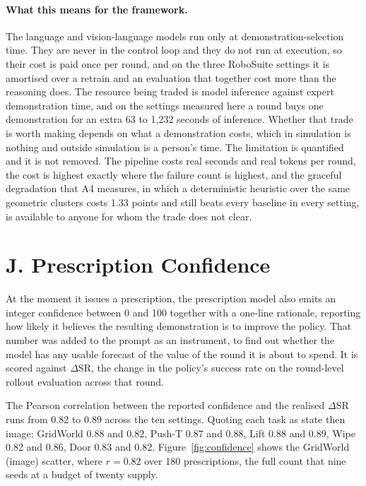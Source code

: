 \documentclass[letterpaper]{article}
\begin{document}
\paragraph{What this means for the framework.} The language and vision-language models
run only at demonstration-selection time. They are never in the control loop and they do
not run at execution, so their cost is paid once per round, and on the three RoboSuite
settings it is amortised over a retrain and an evaluation that together cost more than
the reasoning does. The resource being traded is model inference against expert
demonstration time, and on the settings measured here a round buys one demonstration for
an extra 63 to 1,232 seconds of inference. Whether that trade is worth making depends on
what a demonstration costs, which in simulation is nothing and outside simulation is a
person's time. The limitation is quantified and it is not removed. The pipeline costs
real seconds and real tokens per round, the cost is highest exactly where the failure
count is highest, and the graceful degradation that A4 measures, in which a
deterministic heuristic over the same geometric clusters costs 1.33 points and still
beats every baseline in every setting, is available to anyone for whom the trade does
not clear.

\section{J. Prescription Confidence}

At the moment it issues a prescription, the prescription model also emits an integer
confidence between 0 and 100 together with a one-line rationale, reporting how likely it
believes the resulting demonstration is to improve the policy. That number was added to
the prompt as an instrument, to find out whether the model has any usable forecast of
the value of the round it is about to spend. It is scored against $\Delta$SR, the change
in the policy's success rate on the round-level rollout evaluation across that round.

The Pearson correlation between the reported confidence and the realised $\Delta$SR runs
from 0.82 to 0.89 across the ten settings. Quoting each task as state then image:
GridWorld 0.88 and 0.82, Push-T 0.87 and 0.88, Lift 0.88 and 0.89, Wipe 0.82 and 0.86,
Door 0.83 and 0.82. Figure~\ref{fig:confidence} shows the GridWorld (image) scatter,
where $r = 0.82$ over 180 prescriptions, the full count that nine seeds at a budget of
twenty supply.
\end{document}
